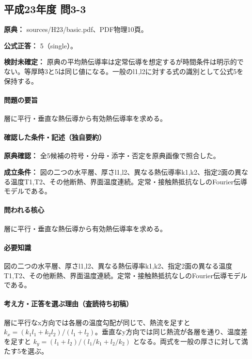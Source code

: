 \subsection{平成23年度 問3-3}
\label{q:h23-reg-basic-3-3}

\noindent\textbf{原典：} sources/H23/basic.pdf、PDF物理10頁。

\textbf{公式正答：} 5（single）。

\par\textbf{検討未確定：} 原典の平均熱伝導率は定常伝導を想定するが時間条件は明示的でない。等厚時3と5は同じ値になる。一般のl1,l2に対する式の識別として公式5を保持する。

\paragraph{問題の要旨} 層に平行・垂直な熱伝導から有効熱伝導率を求める。

\paragraph{確認した条件・記述（独自要約）}\mbox{}\par

\noindent\textbf{原典確認：} 全5候補の符号・分母・添字・否定を原典画像で照合した。\par

\noindent\textbf{成立条件：} 図の二つの水平層、厚さl1,l2、異なる熱伝導率k1,k2、指定2面の異なる温度T1,T2、その他断熱、界面温度連続。定常・接触熱抵抗なしのFourier伝導モデルである。\par

\paragraph{問われる核心} 層に平行・垂直な熱伝導から有効熱伝導率を求める。

\paragraph{必要知識} 図の二つの水平層、厚さl1,l2、異なる熱伝導率k1,k2、指定2面の異なる温度T1,T2、その他断熱、界面温度連続。定常・接触熱抵抗なしのFourier伝導モデルである。

\paragraph{考え方・正答を選ぶ理由（査読待ち初稿）} 層に平行なx方向では各層の温度勾配が同じで、熱流を足すと \(k_x=(k_1l_1+k_2l_2)/(l_1+l_2)\)。垂直なy方向では同じ熱流が各層を通り、温度差を足すと \(k_y=(l_1+l_2)/(l_1/k_1+l_2/k_2)\) となる。両式を一般の厚さに対して満たす5を選ぶ。

